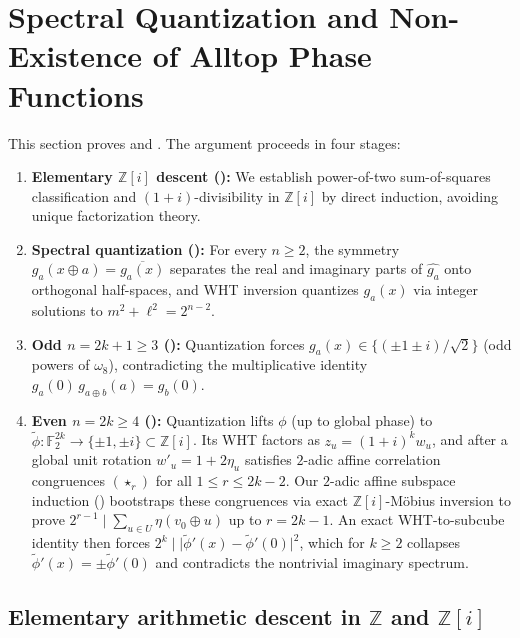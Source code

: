 \documentclass[11pt,a4paper]{article}
\theoremstyle{plain}
\theoremstyle{definition}
\theoremstyle{remark}
\newcommand{\Z}{\mathbb{Z}}
\newcommand{\F}{\mathbb{F}}
\newcommand{\Zi}{\mathbb{Z}[i]}
\newcommand{\abs}[1]{\lvert#1\rvert}
\numberwithin{equation}{section}
\begin{document}
\section{Spectral Quantization and Non-Existence of Alltop Phase Functions}\label{sec:alltop}

This section proves  and . The argument proceeds in four stages:
\begin{enumerate}[leftmargin=1.8em]
  \item \textbf{Elementary $\Zi$ descent ():} We establish power-of-two sum-of-squares classification and $(1+i)$-divisibility in $\Zi$ by direct induction, avoiding unique factorization theory.
  \item \textbf{Spectral quantization ():} For every $n \ge 2$, the symmetry $g_a(x \oplus a) = \overline{g_a(x)}$ separates the real and imaginary parts of $\widehat{g_a}$ onto orthogonal half-spaces, and WHT inversion quantizes $g_a(x)$ via integer solutions to $m^2 + \ell^2 = 2^{n-2}$.
  \item \textbf{Odd $n = 2k+1 \ge 3$ ():} Quantization forces $g_a(x) \in \{(\pm 1 \pm i)/\sqrt{2}\}$ (odd powers of $\omega_8$), contradicting the multiplicative identity $g_a(0)\,g_{a \oplus b}(a) = g_b(0)$.
  \item \textbf{Even $n = 2k \ge 4$ ():} Quantization lifts $\phi$ (up to global phase) to $\tilde{\phi} : \F_2^{2k} \to \{\pm 1, \pm i\} \subset \Zi$. Its WHT factors as $z_u = (1+i)^k w_u$, and after a global unit rotation $w'_u = 1 + 2\eta_u$ satisfies $2$-adic affine correlation congruences $(\star_r)$ for all $1 \le r \le 2k - 2$. Our $2$-adic affine subspace induction () bootstraps these congruences via exact $\Zi$-M\"obius inversion to prove $2^{r-1} \mid \sum_{u \in U} \eta(v_0 \oplus u)$ up to $r = 2k - 1$. An exact WHT-to-subcube identity then forces $2^k \mid \abs{\tilde{\phi}'(x) - \tilde{\phi}'(0)}^2$, which for $k \ge 2$ collapses $\tilde{\phi}'(x) = \pm\tilde{\phi}'(0)$ and contradicts the nontrivial imaginary spectrum.
\end{enumerate}

\subsection{Elementary arithmetic descent in \texorpdfstring{$\Z$}{Z} and \texorpdfstring{$\Zi$}{Z[i]}}\label{sec:gi-descent}
\end{document}
